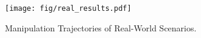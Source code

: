 \begin{figure}[h]
  \texttt{[image: fig/real\_results.pdf]}
    \vspace{-0.8cm}
  \caption{Manipulation Trajectories of Real-World Scenarios.
  }
      \vspace{-0.3cm}
  \label{fig:real_result}
\end{figure}
